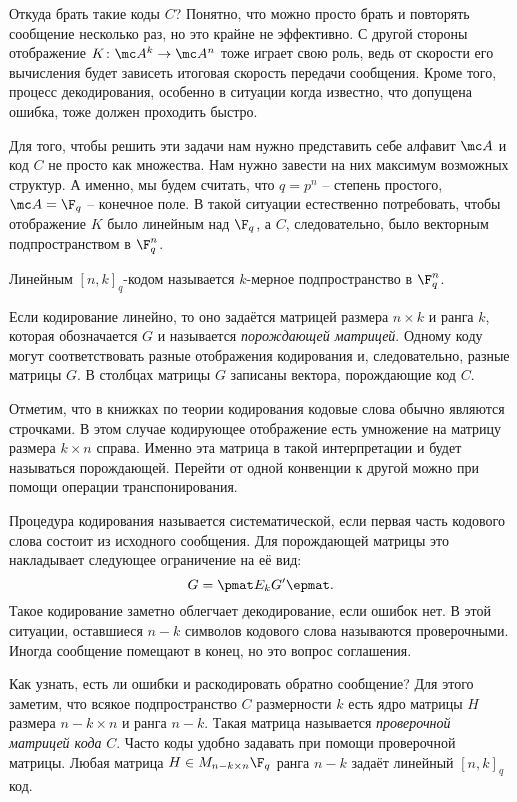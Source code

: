 Откуда брать такие коды $C$? Понятно, что можно просто брать и повторять сообщение несколько раз, но это крайне не эффективно. С другой стороны отображение $K \colon \mc A^k \to \mc A^n$ тоже играет свою роль, ведь от скорости его вычисления будет зависеть итоговая скорость передачи сообщения. Кроме того, процесс декодирования, особенно в ситуации когда известно, что допущена ошибка, тоже должен проходить быстро.

Для того, чтобы решить эти задачи нам нужно представить себе алфавит $\mc A$ и код $C$ не просто как множества. Нам нужно завести на них максимум возможных структур. А именно, мы будем считать, что  $q=p^n$ -- степень простого, $\mc A = \F_q$ -- конечное поле. В такой ситуации естественно потребовать, чтобы отображение $K$ было линейным над $\F_q$, а $C$, следовательно, было векторным подпространством в $\F_q^n$.

\dfn Линейным $[n,k]_q$-кодом называется $k$-мерное подпространство в $\F_q^n$.
\edfn

Если кодирование линейно, то оно задаётся матрицей размера $n\times k$ и ранга $k$, которая обозначается $G$ и называется {\it порождающей матрицей}. Одному коду могут соответствовать разные отображения кодирования и, следовательно, разные матрицы $G$. В столбцах матрицы $G$ записаны вектора, порождающие код $C$. 

Отметим, что в книжках по теории кодирования кодовые слова обычно являются строчками. В этом случае кодирующее отображение есть умножение на матрицу размера $k\times n$ справа. Именно эта матрица в такой интерпретации и будет называться порождающей. Перейти от одной конвенции к другой можно при помощи операции транспонирования.

\dfn Процедура кодирования называется систематической, если первая часть кодового слова состоит из исходного сообщения. Для порождающей матрицы это накладывает следующее ограничение на её вид: 
$$G= \pmat E_k\\ G' \epmat.$$
Такое кодирование заметно облегчает декодирование, если ошибок нет. В этой ситуации, оставшиеся $n-k$ символов кодового слова называются проверочными. Иногда сообщение помещают в конец, но это вопрос соглашения.
\edfn

Как узнать, есть ли ошибки и раскодировать обратно сообщение? Для этого заметим, что всякое подпространство $C$ размерности $k$ есть ядро матрицы $H$ размера $n-k\times n$ и ранга $n-k$. Такая матрица называется {\it проверочной матрицей кода} $C$. Часто коды удобно задавать при помощи проверочной матрицы. Любая матрица $H\in M_{n-k\times n}{\F_q}$ ранга $n-k$ задаёт линейный $[n,k]_q$ код. 

